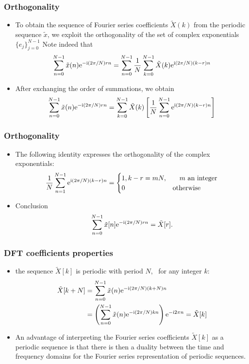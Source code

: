 \begin{frame}
\frametitle{Orthogonality}
\begin{itemize}
\item To obtain the sequence of Fourier series coefficients $\tilde{X}(k)$ from the periodic sequence $\tilde{x}$, we exploit the orthogonality of the set of complex exponentials $\{e_j\}_{j=0}^{N-1}$
\time Note indeed that
\[
\sum_{n=0}^{N-1} \tilde{x}(n) \mathrm{e}^{-\mathrm{i} (2 \pi/N) r n} = \sum_{n=0}^{N-1} \frac{1}{N} \sum_{k=0}^{N-1} \tilde{X}(k) \mathrm{e}^{\mathrm{i} (2 \pi/N) (k-r)n}
\]
\item After exchanging the order of summations, we obtain
\[
\sum_{n=0}^{N-1} \tilde{x}(n) \mathrm{e}^{-\mathrm{i} (2 \pi/N) r n} = \sum_{k=0}^{N-1} \tilde{X}(k) \left[ \frac{1}{N} \sum_{n=0}^{N-1} \mathrm{e}^{\mathrm{i} (2 \pi/N) (k-r) n} \right]
\]
\end{itemize}
\end{frame}

\begin{frame}
\frametitle{Orthogonality}
\begin{itemize}
\item The following identity expresses the orthogonality of the complex exponentials:
$$
\frac{1}{N}\sum_{n=1}^{N-1}\mathrm{e}^{\mathrm{i}(2\pi/N)(k-r)n}=
\begin{cases}
1, k-r= mN, &\quad \text{$m$ an integer} \\
0 & \text{otherwise}
\end{cases}
$$
\item \alert{Conclusion}
$$
\sum_{n=0}^{N-1}\tilde{x}[n] \mathrm{e}^{-\mathrm{i}(2\pi/N)r n}=\tilde{X}[r].
$$
\end{itemize}
\end{frame}

\begin{frame}
\frametitle{DFT coefficients properties}
\begin{itemize}
\item the sequence $\tilde{X}[k]$ is periodic with period $N$, \ie\, for any integer $k$:
\begin{align*}
\tilde{X}[k+N] &=\sum_{n=0}^{N-1}\tilde{x}(n) \mathrm{e}^{-\mathrm{i} (2\pi/N)  (k+N) n} \\
&=\left(\sum_{n=0}^{N-1}\tilde{x}(n) \mathrm{e}^{-\mathrm{i}(2\pi/N)k n} \right) \mathrm{e}^{-\mathrm{i} 2\pi n}=\tilde{X}[k]
\end{align*}
\item An advantage of interpreting the Fourier series coefficients $\tilde{X}[k]$ as a periodic sequence is that there is then a \alert{duality} between the \alert{time} and \alert{frequency domains} for the Fourier series representation of periodic sequences.
\end{itemize}
\end{frame}


